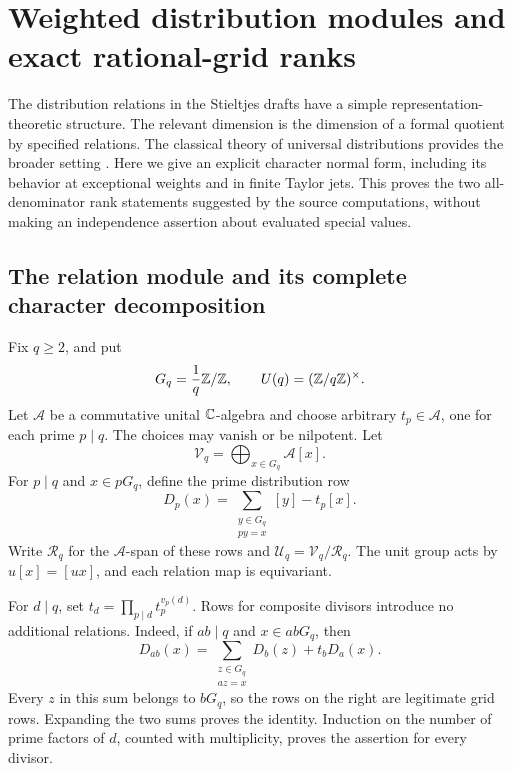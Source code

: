 \section{Weighted distribution modules and exact rational-grid ranks}
\label{sec:distribution}

The distribution relations in the Stieltjes drafts have a simple
representation-theoretic structure. The relevant dimension is the
dimension of a formal quotient by specified relations. The classical
theory of universal distributions provides the broader setting
\cite{Kubert,Ouyang}. Here we give an explicit character normal form,
including its behavior at exceptional weights and in finite Taylor
jets. This proves the two all-denominator rank statements suggested by
the source computations, without making an independence assertion about
evaluated special values.

\subsection{The relation module and its complete character decomposition}

Fix \(q\geq2\), and put
\[
 G_q=\frac1q\mathbb{Z}/\mathbb{Z},\qquad U(q)=(\mathbb{Z}/q\mathbb{Z})^\times.
\]
Let \(\mathcal A\) be a commutative unital \(\mathbb{C}\)-algebra and choose
arbitrary \(t_p\in\mathcal A\), one for each prime \(p\mid q\).
The choices may vanish or be nilpotent. Let
\[
 \mathcal V_q=\bigoplus_{x\in G_q}\mathcal A[x].
\]
For \(p\mid q\) and \(x\in pG_q\), define the prime distribution row
\begin{equation}
 D_p(x)=\sum_{\substack{y\in G_q\\py=x}}[y]-t_p[x].
 \label{eq:dist-prime-row}
\end{equation}
Write \(\mathcal R_q\) for the \(\mathcal A\)-span of these rows and
\(\mathcal U_q=\mathcal V_q/\mathcal R_q\).
The unit group acts by \(u[x]=[ux]\), and each relation map is
equivariant.

For \(d\mid q\), set \(t_d=\prod_{p\mid d}t_p^{v_p(d)}\).
Rows for composite divisors introduce no additional relations. Indeed,
if \(ab\mid q\) and \(x\in abG_q\), then
\begin{equation}
 D_{ab}(x)=
 \sum_{\substack{z\in G_q\\az=x}}D_b(z)+t_bD_a(x).
 \label{eq:dist-composite-row}
\end{equation}
Every \(z\) in this sum belongs to \(bG_q\), so the rows on the right
are legitimate grid rows. Expanding the two sums proves the identity.
Induction on the number of prime factors of \(d\), counted with
multiplicity, proves the assertion for every divisor.

